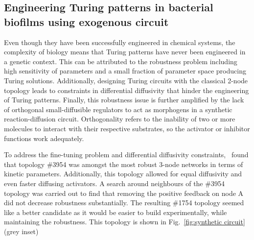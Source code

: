 \subsection{Engineering Turing patterns in bacterial biofilms using exogenous circuit}
Even though they have been successfully engineered in chemical systems, the complexity of biology means that Turing patterns have never been engineered in a genetic context.
This can be attributed to the robustness problem including high sensitivity of parameters and a small fraction of parameter space producing Turing solutions.
Additionally, designing Turing circuits with the classical 2-node topology leads to constraints in differential diffusivity that hinder the engineering of Turing patterns.
Finally, this robustness issue is further amplified by the lack of orthogonal small-diffusible regulators to act as morphogens in a synthetic reaction-diffusion circuit.
Orthogonality refers to the inability of two or more molecules to interact with their respective substrates, so the activator or inhibitor functions work adequately.
%

To address the fine-tuning problem and differential diffusivity constraints,~\cite{Scholes2019} found that topology \#3954 was amongst the most robust 3-node networks in terms of kinetic parameters. %
Additionally, this topology allowed for equal diffusivity and even faster diffusing activators.
A search around neighbours of the \#3954 topology was carried out to find that removing the positive feedback on node A did not decrease robustness substantially.
The resulting \#1754 topology seemed like a better candidate as it would be easier to build experimentally, while maintaining the robustness.
This topology is shown in Fig.~\ref{fig:synthetic circuit} (grey inset)

